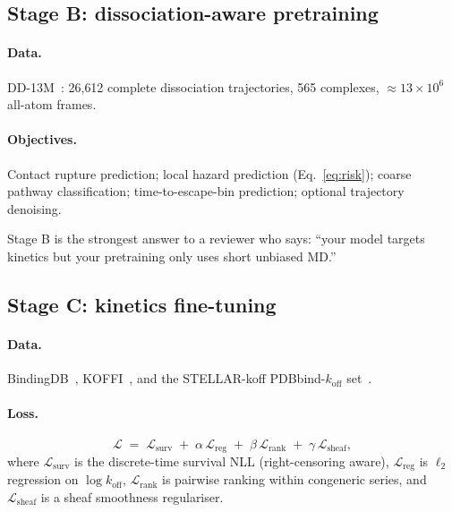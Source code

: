 \documentclass[12pt,a4paper]{article}
\begin{document}
\subsection{Stage B: dissociation-aware pretraining}

\paragraph{Data.}
DD-13M~\citep{dd13m2025}: 26{,}612 complete dissociation trajectories,
565 complexes, ${\approx}13\times10^6$ all-atom frames.

\paragraph{Objectives.}
Contact rupture prediction; local hazard prediction
(Eq.~\ref{eq:risk}); coarse pathway classification;
time-to-escape-bin prediction; optional trajectory denoising.

\begin{claimbox}
Stage B is the strongest answer to a reviewer who says: ``your model
targets kinetics but your pretraining only uses short unbiased MD.''
\end{claimbox}

\subsection{Stage C: kinetics fine-tuning}

\paragraph{Data.}
BindingDB~\citep{bindingdb2025}, KOFFI~\citep{koffi2019}, and the
STELLAR-koff PDBbind-$k_{\text{off}}$ set~\citep{stellarkoff2025}.

\paragraph{Loss.}
\begin{equation}
  \mathcal{L}
  \;=\;
  \mathcal{L}_{\mathrm{surv}}
  \;+\;
  \alpha\,\mathcal{L}_{\mathrm{reg}}
  \;+\;
  \beta\,\mathcal{L}_{\mathrm{rank}}
  \;+\;
  \gamma\,\mathcal{L}_{\mathrm{sheaf}},
  \label{eq:loss}
\end{equation}
where $\mathcal{L}_{\mathrm{surv}}$ is the discrete-time survival NLL
(right-censoring aware), $\mathcal{L}_{\mathrm{reg}}$ is $\ell_2$
regression on $\log k_{\text{off}}$, $\mathcal{L}_{\mathrm{rank}}$ is
pairwise ranking within congeneric series, and $\mathcal{L}_{\mathrm{sheaf}}$
is a sheaf smoothness regulariser.
\end{document}
